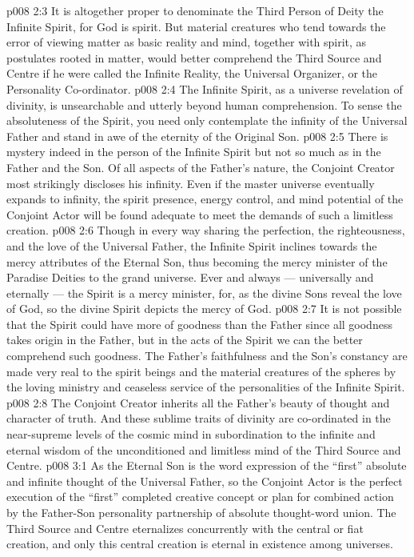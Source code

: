\vs p008 2:3 It is altogether proper to denominate the Third Person of Deity the Infinite Spirit, for God is spirit. But material creatures who tend towards the error of viewing matter as basic reality and mind, together with spirit, as postulates rooted in matter, would better comprehend the Third Source and Centre if he were called the Infinite Reality, the Universal Organizer, or the Personality Co\hyp{}ordinator.
\vs p008 2:4 \pc The Infinite Spirit, as a universe revelation of divinity, is unsearchable and utterly beyond human comprehension. To sense the absoluteness of the Spirit, you need only contemplate the infinity of the Universal Father and stand in awe of the eternity of the Original Son.
\vs p008 2:5 \pc There is mystery indeed in the person of the Infinite Spirit but not so much as in the Father and the Son. Of all aspects of the Father’s nature, the Conjoint Creator most strikingly discloses his infinity. Even if the master universe eventually expands to infinity, the spirit presence, energy control, and mind potential of the Conjoint Actor will be found adequate to meet the demands of such a limitless creation.
\vs p008 2:6 Though in every way sharing the perfection, the righteousness, and the love of the Universal Father, the Infinite Spirit inclines towards the mercy attributes of the Eternal Son, thus becoming the mercy minister of the Paradise Deities to the grand universe. Ever and always --- universally and eternally --- the Spirit is a mercy minister, for, as the divine Sons reveal the love of God, so the divine Spirit depicts the mercy of God.
\vs p008 2:7 It is not possible that the Spirit could have more of goodness than the Father since all goodness takes origin in the Father, but in the acts of the Spirit we can the better comprehend such goodness. The Father’s faithfulness and the Son’s constancy are made very real to the spirit beings and the material creatures of the spheres by the loving ministry and ceaseless service of the personalities of the Infinite Spirit.
\vs p008 2:8 The Conjoint Creator inherits all the Father’s beauty of thought and character of truth. And these sublime traits of divinity are co\hyp{}ordinated in the near\hyp{}supreme levels of the cosmic mind in subordination to the infinite and eternal wisdom of the unconditioned and limitless mind of the Third Source and Centre.
\vs p008 3:1 As the Eternal Son is the word expression of the “first” absolute and infinite thought of the Universal Father, so the Conjoint Actor is the perfect execution of the “first” completed creative concept or plan for combined action by the Father\hyp{}Son personality partnership of absolute thought\hyp{}word union. The Third Source and Centre eternalizes concurrently with the central or fiat creation, and only this central creation is eternal in existence among universes.
